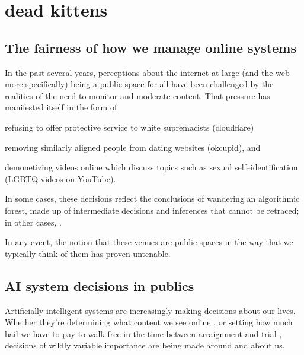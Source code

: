 \documentclass[main]{subfiles}
\begin{document}
\section{dead kittens}
\subsection{The fairness of how we manage online systems}
In the past several years, perceptions about the internet at large (and the web more specifically) being a public space for all
have been challenged by the realities of the need to monitor and moderate content.
That pressure has manifested itself in the form of
\begin{enumerate*}
  \item refusing to offer protective service to white supremacists (cloudflare)
  \item removing similarly aligned people from dating websites (okcupid), and
  \item demonetizing videos online which discuss topics such as sexual self--identification (LGBTQ videos on YouTube).
\end{enumerate*}
In some cases, these decisions reflect the conclusions of wandering an algorithmic forest,
made up of intermediate decisions and inferences that cannot be retraced;
in other cases, .

In any event, the notion that these venues are public spaces in the way that we typically think of them has proven untenable.



\subsection{AI system decisions in publics}
Artificially intelligent systems are increasingly making decisions about our lives.
Whether they're determining what content we see online ,
or setting how much bail we have to pay to walk free in the time between arraignment and trial ,
decisions of wildly variable importance are being made around and about us.
\end{document}
